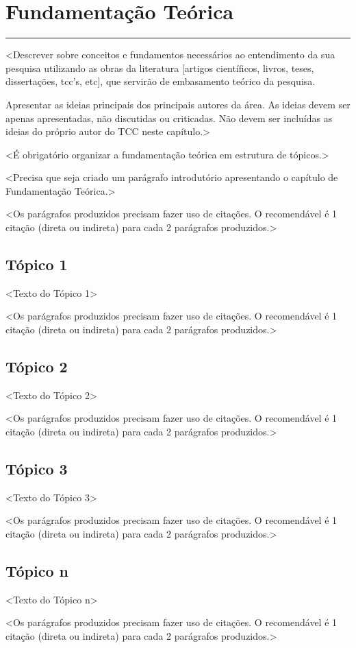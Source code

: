 \section{Fundamentação Teórica}

\vspace{-0.4cm}

\noindent\rule{\textwidth}{0.7pt}

<Descrever sobre conceitos e fundamentos necessários ao entendimento da sua pesquisa utilizando as obras da literatura [artigos científicos, livros, teses, dissertações, tcc’s, etc], que servirão de embasamento teórico da pesquisa.

Apresentar as ideias principais dos principais autores da área. As ideias devem ser apenas apresentadas, não discutidas ou criticadas. Não devem ser incluídas as ideias do próprio autor do TCC neste capítulo.>

<É obrigatório organizar a fundamentação teórica em estrutura de tópicos.>

<Precisa que seja criado um parágrafo introdutório apresentando o capítulo de Fundamentação Teórica.>

<Os parágrafos produzidos precisam fazer uso de citações. O recomendável é 1 citação (direta ou indireta) para cada 2 parágrafos produzidos.>

\subsection{Tópico 1}

<Texto do Tópico 1>

<Os parágrafos produzidos precisam fazer uso de citações. O recomendável é 1 citação (direta ou indireta) para cada 2 parágrafos produzidos.>

\subsection{Tópico 2}

<Texto do Tópico 2>

<Os parágrafos produzidos precisam fazer uso de citações. O recomendável é 1 citação (direta ou indireta) para cada 2 parágrafos produzidos.>

\subsection{Tópico 3}

<Texto do Tópico 3>

<Os parágrafos produzidos precisam fazer uso de citações. O recomendável é 1 citação (direta ou indireta) para cada 2 parágrafos produzidos.>

\subsection{Tópico n}

<Texto do Tópico n>

<Os parágrafos produzidos precisam fazer uso de citações. O recomendável é 1 citação (direta ou indireta) para cada 2 parágrafos produzidos.>

